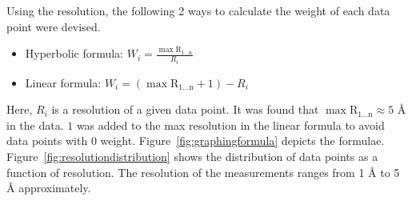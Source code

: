 \documentclass[11pt]{article}
\begin{document}
Using the resolution, the following 2 ways to calculate the weight of each data point were devised.
\begin{itemize}
\item Hyperbolic formula: $  W_i = \frac{ \mathrm{\max{R_{1 ...  n}}}}{R_i}  $
\item Linear formula: $ W_i = (\mathrm{\max{R_{1 ...  n}}} + 1) - R_i $
\end{itemize}

Here, $R_i$ is a resolution of a given data point.
It was found that $\mathrm{\max{R_{1 ...  n}}} \approx 5$ \si{\angstrom} in the data.
$1$ was added to the max resolution in the linear formula to avoid data points with $0$ weight.
Figure~\ref{fig:graphingformula} depicts the formulae.
Figure~\ref{fig:resolutiondistribution} shows the distribution of data points as a function of resolution.
The resolution of the measurements ranges from 1 \si{\angstrom} to 5 \si{\angstrom} approximately.
\end{document}
